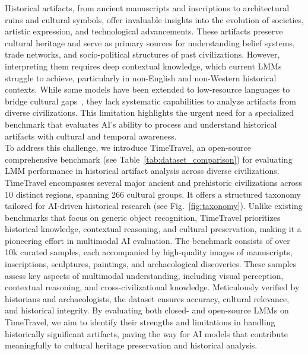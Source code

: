 \documentclass[11pt]{article}
\begin{document}
Historical artifacts, from ancient manuscripts and inscriptions to architectural ruins and cultural symbols, offer invaluable insights into the evolution of societies, artistic expression, and technological advancements. These artifacts preserve cultural heritage and serve as primary sources for understanding belief systems, trade networks, and socio-political structures of past civilizations. However, interpreting them requires deep contextual knowledge, which current LMMs struggle to achieve, particularly in non-English and non-Western historical contexts. While some models have been extended to low-resource languages to bridge cultural gaps~\cite{heakl2025ainarabicinclusivelarge}, they lack systematic capabilities to analyze artifacts from diverse civilizations. This limitation highlights the urgent need for a specialized benchmark that evaluates AI’s ability to process and understand historical artifacts with cultural and temporal awareness.\\
To address this challenge, we introduce TimeTravel, an open-source comprehensive benchmark (see Table~\ref{tab:dataset_comparison}) for evaluating LMM performance in historical artifact analysis across diverse civilizations. TimeTravel encompasses several major ancient and prehistoric civilizations across 10 distinct regions, spanning 266 cultural groups. It offers a structured taxonomy tailored for AI-driven historical research (see Fig.~\ref{fig:taxonomy}). Unlike existing benchmarks that focus on generic object recognition, TimeTravel prioritizes historical knowledge, contextual reasoning, and cultural preservation, making it a pioneering effort in multimodal AI evaluation. The benchmark consists of over 10k curated samples, each accompanied by high-quality images of manuscripts, inscriptions, sculptures, paintings, and archaeological discoveries. These samples assess key aspects of multimodal understanding, including visual perception, contextual reasoning, and cross-civilizational knowledge. Meticulously verified by historians and archaeologists, the dataset ensures accuracy, cultural relevance, and historical integrity. By evaluating both closed- and open-source LMMs on TimeTravel, we aim to identify their strengths and limitations in handling historically significant artifacts, paving the way for AI models that contribute meaningfully to cultural heritage preservation and historical analysis.
\end{document}
